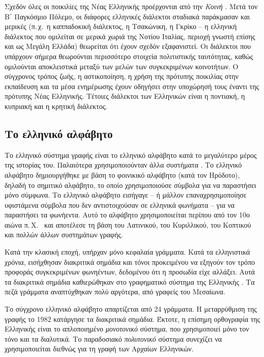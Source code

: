 \begin{multicols}{2}
Σχεδόν όλες οι ποικιλίες της Νέας Ελληνικής προέρχονται από την \textit{Κοινή} \cite{Bro1}. Μετά τον Β΄ Παγκόσμιο Πόλεμο, οι διάφορες ελληνικές διάλεκτοι σταδιακά παράκμασαν και μερικές (π.\,χ.~η καππαδοκική διάλεκτος, η Τσακώνικη, η Γκρίκο – η ελληνική διάλεκτος που ομιλείται σε μερικά χωριά της Νοτίου Ιταλίας, περιοχή γνωστή επίσης και ως Μεγάλη Ελλάδα) θεωρείται ότι έχουν σχεδόν εξαφανιστεί. Οι διάλεκτοι που υπάρχουν σήμερα θεωρούνται περισσότερο στοιχεία πολιτιστικής ταυτότητας, καθώς ομιλούνται αποκλειστικά μεταξύ των μελών  των συγκεκριμένων κοινοτήτων. Ο σύγχρονος τρόπος ζωής, η αστικοποίηση, η χρήση της πρότυπης ποικιλίας στην εκπαίδευση και τα μέσα ενημέρωσης έχουν οδηγήσει στην υποχώρησή τους έναντι της πρότυπης Νέας Ελληνικής. Τέτοιες διάλεκτοι των Ελληνικών είναι η ποντιακή, η κυπριακή και η κρητική διάλεκτος. 

\subsection{Το ελληνικό αλφάβητο}

Το ελληνικό σύστημα γραφής είναι το ελληνικό αλφάβητο κατά το μεγαλύτερο μέρος της ιστορίας του. Παλαιότερα χρησιμοποιούνταν άλλα συστήματα \cite{Kopi1}. Το ελληνικό αλφάβητο δημιουργήθηκε με βάση το φοινικικό αλφάβητο (κατά τον Ηρόδοτο), δηλαδή το σημιτικό αλφάβητο, το οποίο χρησιμοποιούσε σύμβολα για να παραστήσει μόνο σύμφωνα. Το ελληνικό αλφάβητο εισήγαγε – ή μάλλον επαναχρησιμοποίησε υφιστάμενα σύμβολα που δεν αντιστοιχούσαν σε ελληνικά φωνήματα – για να παραστήσει τα φωνήεντα. Αυτό το αλφάβητο χρησιμοποιείται περίπου από τον 10ο αιώνα π.\,Χ.~\cite{Tonn1} και αποτέλεσε τη βάση του Λατινικού, του Κυριλλικού, του Κοπτικού και πολλών άλλων συστημάτων γραφής.

Κατά την κλασική εποχή, υπήρχαν μόνο κεφαλαία γράμματα. Κατά τα ελληνιστικά χρόνια, εισήχθησαν διακριτικά σημάδια και τόνοι προκειμένου να εξηγούν τον τρόπο προφοράς συγκεκριμένων φωνηέντων, δεδομένου ότι η προσωδία είχε αλλάξει. Αυτά τα διακριτικά σημάδια καθιερώθηκαν στο γραφηματικό  σύστημα της Ελληνικής \cite{Chris1}. Τα πεζά γράμματα αναπτύχθηκαν πολύ αργότερα, από γραφείς του Μεσαίωνα.

Το σύγχρονο ελληνικό αλφάβητο απαρτίζεται από 24 γράμματα. Η μεταρρύθμιση της γραφής το 1982 κατάργησε τα διακριτικά σημάδια. Έκτοτε, η επίσημη ορθογραφία της Ελληνικής είναι το απλοποιημένο \textit{μονοτονικό} σύστημα, που χρησιμοποιεί μόνο τον τόνο και τα διαλυτικά. Το παραδοσιακό \textit{πολυτονικό} σύστημα συνεχίζει να χρησιμοποιείται διεθνώς για τη γραφή των Αρχαίων Ελληνικών.


\end{multicols}
